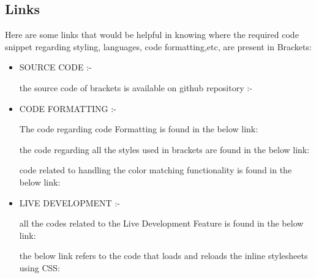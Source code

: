 \subsection{Links}
Here are some links that would be helpful in knowing where the required code snippet
regarding styling, languages, code formatting,etc, are present in Brackets: \newline
\begin{itemize}
\item SOURCE CODE :- \newline
\begin{center}
the source code of brackets is available on github repository :- 
\end{center}
\item CODE FORMATTING :- \newline
\begin{center}
The code regarding code Formatting is found in the below link: 
\end{center}
\begin{center}
the code regarding all the styles used in brackets are found in the below link: 
\end{center}
\begin{center}
code related to handling the color matching functionality is found in the below link:  
\end{center}
\item LIVE DEVELOPMENT :- \newline
\begin{center}
all the codes related to the Live Development Feature is found in the below link: 
\end{center}
\begin{center}
the below link refers to the code that loads and reloads the inline stylesheets using CSS: 
\end{center}

\end{itemize}
